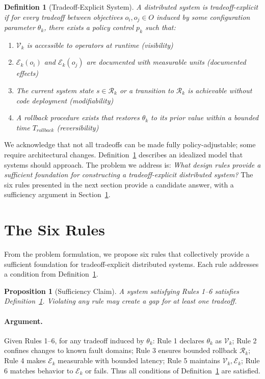 \documentclass[conference]{IEEEtran}
\newtheorem{definition}[theorem]{Definition}
\newtheorem{proposition}[theorem]{Proposition}
\begin{document}
\begin{definition}[Tradeoff-Explicit System]
\label{def:te}
A distributed system is \textit{tradeoff-explicit} if for every tradeoff between objectives $o_i, o_j \in O$ induced by some configuration parameter $\theta_k$, there exists a policy control $p_k$ such that:
\begin{enumerate}
    \item $\mathcal{V}_k$ is accessible to operators at runtime (visibility)
    \item $\mathcal{E}_k(o_i)$ and $\mathcal{E}_k(o_j)$ are documented with measurable units (documented effects)
    \item The current system state $s \in \mathcal{R}_k$ or a transition to $\mathcal{R}_k$ is achievable without code deployment (modifiability)
    \item A rollback procedure exists that restores $\theta_k$ to its prior value within a bounded time $T_{rollback}$ (reversibility)
\end{enumerate}
\end{definition}


We acknowledge that not all tradeoffs can be made fully policy-adjustable; some require architectural changes. Definition~\ref{def:te} describes an idealized model that systems should approach. The problem we address is: \textit{What design rules provide a sufficient foundation for constructing a tradeoff-explicit distributed system?} The six rules presented in the next section provide a candidate answer, with a sufficiency argument in Section~\ref{sec:rules}.

\section{The Six Rules}
\label{sec:rules}


From the problem formulation, we propose six rules that collectively provide a sufficient foundation for tradeoff-explicit distributed systems. Each rule addresses a condition from Definition~\ref{def:te}.


\begin{proposition}[Sufficiency Claim]
\label{thm:rules_complete}
A system satisfying Rules 1--6 satisfies Definition~\ref{def:te}. Violating any rule may create a gap for at least one tradeoff.
\end{proposition}


\paragraph{Argument.}
Given Rules 1--6, for any tradeoff induced by $\theta_k$: Rule 1 declares $\theta_k$ as $\mathcal{V}_k$; Rule 2 confines changes to known fault domains; Rule 3 ensures bounded rollback $\mathcal{R}_k$; Rule 4 makes $\mathcal{E}_k$ measurable with bounded latency; Rule 5 maintains $\mathcal{V}_k,\mathcal{E}_k$; Rule 6 matches behavior to $\mathcal{E}_k$ or fails. Thus all conditions of Definition~\ref{def:te} are satisfied.
\end{document}
